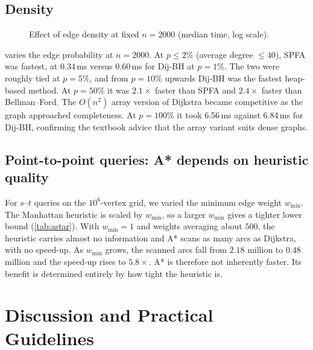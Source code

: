 \documentclass[conference]{IEEEtran}
\begin{document}
\subsection{Density}
\begin{figure}[t]
\centering
\resizebox{\columnwidth}{!}{}
\caption{Effect of edge density at fixed $n=2000$ (median time, log scale).}
\label{fig:density}
\end{figure}
 varies the edge probability at $n=2000$. At $p\le 2\%$
(average degree $\le 40$), SPFA was fastest, at $0.34$\,ms versus $0.60$\,ms
for Dij-BH at $p=1\%$. The two were roughly tied at $p=5\%$, and from
$p=10\%$ upwards Dij-BH was the fastest heap-based method. At $p=50\%$ it was
$2.1\times$ faster than SPFA and $2.4\times$ faster than Bellman--Ford. The
$O(n^2)$ array version of Dijkstra became competitive as the graph approached
completeness. At $p=100\%$ it took 6.56\,ms against 6.84\,ms for Dij-BH,
confirming the textbook advice that the array variant suits dense graphs.

\subsection{Point-to-point queries: A* depends on heuristic quality}
\begin{table}[t]
\centering
\caption{Point-to-point queries on a $1000\times1000$ grid with weights $U[w_{\min},1000]$ and heuristic $w_{\min}\cdot$Manhattan distance (20 random pairs each).}
\label{tab:astar}
\footnotesize
\setlength{\tabcolsep}{4pt}

\end{table}
For $s$--$t$ queries on the $10^6$-vertex grid, we varied the minimum edge
weight $w_{\min}$. The Manhattan heuristic is scaled by $w_{\min}$, so a larger
$w_{\min}$ gives a tighter lower bound (\cref{tab:astar}). With $w_{\min}=1$
and weights averaging about $500$, the heuristic carries almost no information
and A* scans as many arcs as Dijkstra, with no speed-up. As $w_{\min}$ grows,
the scanned arcs fall from $2.18$ million to $0.48$ million and the speed-up
rises to $5.8\times$. A* is therefore not inherently faster. Its benefit is
determined entirely by how tight the heuristic is.

\section{Discussion and Practical Guidelines}
\end{document}

